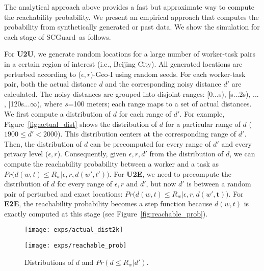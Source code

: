\documentclass{USC-Thesis}
\newcommand{\SCG}{{SCGuard}}
\numberwithin{equation}{chapter}
\begin{document}
The analytical approach above provides a fast but approximate way to compute the reachability probability. We present an empirical approach that computes the probability from synthetically generated or past data. We show the simulation for each stage of \SCG\ as follows.

For \textbf{U2U}, we generate random locations for a large number of worker-task pairs in a certain region of interest (i.e., Beijing City). All generated locations are perturbed according to ($\epsilon,r$)-Geo-I using random seeds. For each worker-task pair, both the actual distance $d$ and the corresponding noisy distance $d'$ are calculated. The noisy distances are grouped into disjoint ranges: [0...s), [s...2s), ... , [120s...$\infty$), where $s$=100 meters; each range maps to a set of actual distances. We first compute a distribution of $d$ for each range of $d'$. For example, Figure~\ref{fig:actual_dist} shows the distribution of $d$ for a particular range of $d$ ($1900\le d'< 2000$). This distribution centers at the corresponding range of $d'$. Then, the distribution of $d$ can be precomputed for every range of $d'$ and every privacy level ($\epsilon, r$). Consequently, given $\epsilon, r, d'$ from the distribution of $d$, we can compute the reachability probability between a worker and a task as $\mathit{Pr\big(d(w,t) \le R_w | \epsilon,r,d(w',t')\big)}$.
For \textbf{U2E}, we need to precompute the distribution of $d$ for every range of $\epsilon, r$ and $d'$, but now $d'$ is between a random pair of perturbed and exact locations: $\mathit{Pr\big(d(w,t) \le R_w | \epsilon,r,d(w',\mathbf{t})\big)}$.
For \textbf{E2E}, the reachability probability becomes a step function because $d(w,t)$ is exactly computed at this stage (see Figure~\ref{fig:reachable_prob}).

\begin{figure}[ht]
	\begin{minipage}[b]{.45\linewidth}
		\centering
		\texttt{[image: exps/actual\_dist2k]}
		\captionsetup{format=hang}
		\label{fig:actual_dist}
	\end{minipage}
	\vspace{10pt}
	\begin{minipage}[b]{.45\linewidth}
		\centering
		\texttt{[image: exps/reachable\_prob]}
        \captionsetup{format=hang}
		\label{fig:reachable_prob}
	\end{minipage}
	\caption{Distributions of $d$ and $Pr(d\le R_w|d')$.}
	\label{fig:empirical}
\end{figure}
\end{document}
